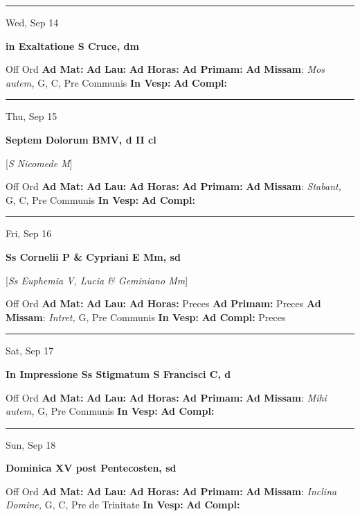 \documentclass[letterpaper, 10pt]{article}
\begin{document}
\hrule
\begin{center}
Wed, Sep 14
\end{center}\textbf{ \large in Exaltatione S Cruce, \textnormal{\normalsize dm}}
\begin{justify}
Off Ord
\textbf{Ad Mat: }
\textbf{Ad Lau: }
\textbf{Ad Horas: }
\textbf{Ad Primam: }
\textbf{Ad Missam}: \textit{Mos autem,} G, C, Pre Communis
\textbf{In Vesp: }
\textbf{Ad Compl: }\end{justify}



\hrule
\begin{center}
Thu, Sep 15
\end{center}\textbf{ \large Septem Dolorum BMV, \textnormal{\normalsize d II cl}}

[\textit{S Nicomede M}]
\begin{justify}
Off Ord
\textbf{Ad Mat: }
\textbf{Ad Lau: }
\textbf{Ad Horas: }
\textbf{Ad Primam: }
\textbf{Ad Missam}: \textit{Stabant,} G, C, Pre Communis
\textbf{In Vesp: }
\textbf{Ad Compl: }\end{justify}



\hrule
\begin{center}
Fri, Sep 16
\end{center}\textbf{ \large Ss Cornelii P \& Cypriani E Mm, \textnormal{\normalsize sd}}

[\textit{Ss Euphemia V, Lucia \& Geminiano Mm}]
\begin{justify}
Off Ord
\textbf{Ad Mat: }
\textbf{Ad Lau: }
\textbf{Ad Horas: }Preces
\textbf{Ad Primam: }Preces
\textbf{Ad Missam}: \textit{Intret,} G, Pre Communis
\textbf{In Vesp: }
\textbf{Ad Compl: }Preces\end{justify}



\hrule
\begin{center}
Sat, Sep 17
\end{center}\textbf{ \large In Impressione Ss Stigmatum S Francisci C, \textnormal{\normalsize d}}
\begin{justify}
Off Ord
\textbf{Ad Mat: }
\textbf{Ad Lau: }
\textbf{Ad Horas: }
\textbf{Ad Primam: }
\textbf{Ad Missam}: \textit{Mihi autem,} G, Pre Communis
\textbf{In Vesp: }
\textbf{Ad Compl: }\end{justify}



\hrule
\begin{center}
Sun, Sep 18
\end{center}\textbf{ \large Dominica XV post Pentecosten, \textnormal{\normalsize sd}}
\begin{justify}
Off Ord
\textbf{Ad Mat: }
\textbf{Ad Lau: }
\textbf{Ad Horas: }
\textbf{Ad Primam: }
\textbf{Ad Missam}: \textit{Inclina Domine,} G, C, Pre de Trinitate
\textbf{In Vesp: }
\textbf{Ad Compl: }\end{justify}
\end{document}

